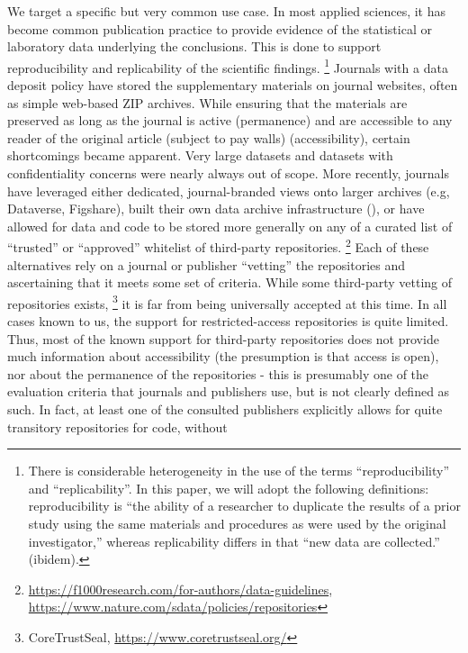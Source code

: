 We target a specific but very common use case. In most applied sciences,
it has become common publication practice to provide evidence of the
statistical or laboratory data underlying the conclusions. This is done
to support reproducibility and replicability of the scientific
findings.%
\footnote{There is considerable heterogeneity in the use of the terms
	``reproducibility'' and ``replicability''. In this paper, we will adopt
	the following definitions: reproducibility is ``the ability of a
	researcher to duplicate the results of a prior study using the same
	materials and procedures as were used by the original investigator,''
	\parencite{BollenSocialBehavioralEconomic2015} whereas replicability
	differs in that ``new data are collected.'' (ibidem).} 
Journals with a
data deposit policy have stored the supplementary materials on journal
websites, often as simple web-based ZIP archives. While ensuring that
the materials are preserved as long as the journal is active
(permanence) and are accessible to any reader of the original article
(subject to pay walls) (accessibility), certain shortcomings became
apparent. Very large datasets and datasets with confidentiality concerns
were nearly always out of scope. More recently, journals have leveraged
either dedicated, journal-branded views onto larger archives (e.g,
Dataverse, Figshare), built their own data archive infrastructure
(), or have allowed for data and code to be stored
more generally on any of a curated list of ``trusted'' or ``approved''
whitelist of third-party repositories.%
\footnote{\url{https://f1000research.com/for-authors/data-guidelines}, \url{https://www.nature.com/sdata/policies/repositories}}
Each of these alternatives rely
on a journal or publisher ``vetting'' the repositories and ascertaining
that it meets some set of criteria.  While some third-party vetting of
repositories exists,%
\footnote{CoreTrustSeal, \url{https://www.coretrustseal.org/}}
it is far from being universally accepted at this
time. In all cases known to us, the support for restricted-access
repositories is quite limited. Thus, most of the known support for
third-party repositories does not provide much information about
accessibility (the presumption is that access is open), nor about the
permanence of the repositories - this is presumably one of the
evaluation criteria that journals and publishers use, but is not clearly
defined as such. In fact, at least one of the consulted publishers
explicitly allows for quite transitory repositories for code, without
